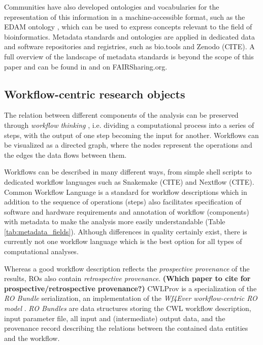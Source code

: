 Communities have also developed ontologies and vocabularies for the representation of this information in a machine-accessible format, such as the EDAM ontology \cite{isonEDAMOntologyBioinformatics2013}, which can be used to express concepts relevant to the field of bioinformatics. Metadata standards and ontologies are applied in dedicated data and software repositories and registries, such as bio.tools \cite{isonBioToolsRegistry2019} and Zenodo (CITE). A full overview of the landscape of metadata standards is beyond the scope of this paper and can be found in \cite{leipzigRoleMetadataReproducible2021} and on FAIRSharing.org.

\subsection{Workflow-centric research objects}

The relation between different components of the analysis can be preserved through \emph{workflow thinking} \cite{grykWorkflowsProvenanceInformation2017}, i.e. dividing a computational process into a series of steps, with the output of one step becoming the input for another. Workflows can be visualized as a directed graph, where the nodes represent the operations and the edges the data flows between them.

Workflows can be described in many different ways, from simple shell scripts to dedicated workflow languages such as Snakemake (CITE) and Nextflow (CITE). Common Workflow Language \cite{crusoeMethodsIncludedStandardizing2022} is a standard for workflow descriptions which in addition to the sequence of operations (steps) also facilitates specification of software and hardware requirements and annotation of workflow (components) with metadata to make the analysis more easily understandable (Table \ref{tab:metadata_fields}). Although differences in quality certainly exist, there is currently not one workflow language which is the best option for all types of computational analyses.


Whereas a good workflow description reflects the \emph{prospective provenance} of the results, ROs \cite{bechhoferWhyLinkedData2011} also contain \emph{retrospective provenance}. \textbf{(Which paper to cite for prospective/retrospective provenance?) } CWLProv is a specialization of the \emph{RO Bundle} serialization, an implementation of the \emph{Wf4Ever workflow-centric RO model} \cite{belhajjameWorkflowcentricResearchObjects2012}. \emph{RO Bundles} are data structures storing the CWL workflow description, input parameter file, all input and (intermediate) output data, and the provenance record describing the relations between the contained data entities and the workflow. 

